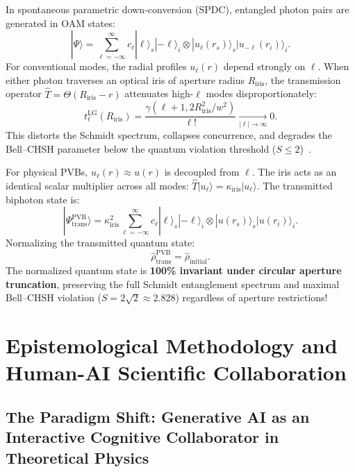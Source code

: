 \documentclass[11pt,a4paper]{article}
\begin{document}
In spontaneous parametric down-conversion (SPDC), entangled photon pairs are generated in OAM states:
\begin{equation}
|\Psi\rangle = \sum_{\ell=-\infty}^\infty c_\ell |\ell\rangle_s |-\ell\rangle_i \otimes |u_\ell(r_s)\rangle_s |u_{-\ell}(r_i)\rangle_i.
\label{eq:spdc_biphoton_state}
\end{equation}
For conventional modes, the radial profiles $u_\ell(r)$ depend strongly on $\ell$. When either photon traverses an optical iris of aperture radius $R_{\text{iris}}$, the transmission operator $\hat{T} = \Theta(R_{\text{iris}} - r)$ attenuates high-$\ell$ modes disproportionately:
\begin{equation}
t_\ell^{\text{LG}}(R_{\text{iris}}) = \frac{\gamma(\ell+1, 2 R_{\text{iris}}^2 / w^2)}{\ell!} \xrightarrow[|\ell| \to \infty]{} 0.
\label{eq:lg_pupil_attenuation}
\end{equation}
This distorts the Schmidt spectrum, collapses concurrence, and degrades the Bell--CHSH parameter below the quantum violation threshold ($S \le 2$)~\cite{Clauser1969,LawEberly2004,Walborn2010}.

For physical PVBs, $u_\ell(r) \approx u(r)$ is decoupled from $\ell$. The iris acts as an identical scalar multiplier across all modes: $\hat{T} |u_\ell\rangle = \kappa_{\text{iris}} |u_\ell\rangle$. The transmitted biphoton state is:
\begin{equation}
|\Psi_{\text{trans}}^{\text{PVB}}\rangle = \kappa_{\text{iris}}^2 \sum_{\ell=-\infty}^\infty c_\ell |\ell\rangle_s |-\ell\rangle_i \otimes |u(r_s)\rangle_s |u(r_i)\rangle_i.
\label{eq:pvb_transmitted_biphoton}
\end{equation}
Normalizing the transmitted quantum state:
\begin{equation}
\boxed{\hat{\rho}_{\text{trans}}^{\text{PVB}} = \hat{\rho}_{\text{initial}}.}
\label{eq:rho_invariance}
\end{equation}
The normalized quantum state is \textbf{100\% invariant under circular aperture truncation}, preserving the full Schmidt entanglement spectrum and maximal Bell--CHSH violation ($S = 2\sqrt{2} \approx 2.828$) regardless of aperture restrictions!

\section{Epistemological Methodology and Human-AI Scientific Collaboration}
\label{sec:co_creation}

\subsection{The Paradigm Shift: Generative AI as an Interactive Cognitive Collaborator in Theoretical Physics}
\label{subsec:paradigm_shift}
\end{document}
